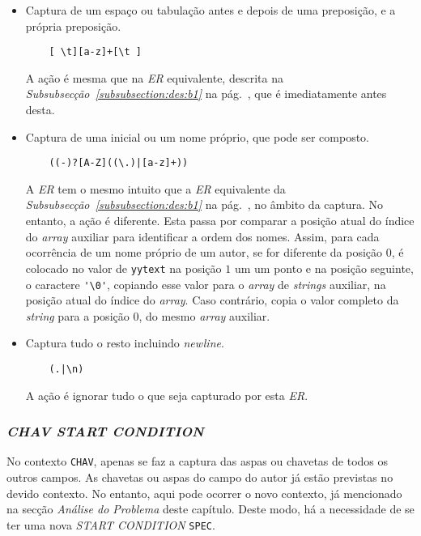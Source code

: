 \begin{itemize}
  
   \item Captura de um espaço ou tabulação antes e depois de uma
     preposição, e a própria preposição.
    \begin{verbatim}
    [ \t][a-z]+[\t ]
    \end{verbatim}
    A ação é mesma que na \emph{ER} equivalente, descrita na
    \emph{Subsubsecção~\ref{subsubsection:des:b1}} na
    pág.~\pageref{subsubsection:des:b1}, que é imediatamente antes desta.


   \item Captura de uma inicial ou um nome próprio, que  pode ser composto.
    \begin{verbatim}
    ((-)?[A-Z]((\.)|[a-z]+))
    \end{verbatim}
    A \emph{ER} tem o mesmo intuito que a \emph{ER} equivalente da
    \emph{Subsubsecção~\ref{subsubsection:des:b1}} na
    pág.~\pageref{subsubsection:des:b1}, no âmbito da captura. No entanto,
    a ação é diferente.  Esta passa por comparar a posição atual do índice do
    \emph{array} auxiliar para identificar a ordem dos nomes. Assim, para cada
    ocorrência de um nome próprio de um autor, se for diferente da posição $0$,
    é colocado no valor de \texttt{yytext} na posição $1$ um um ponto e na
    posição seguinte, o caractere \verb|'\0'|, copiando esse valor para
    o \emph{array} de \emph{strings} auxiliar, na posição atual do índice do
    \emph{array}. Caso contrário, copia o valor completo da \emph{string} para
    a posição $0$, do mesmo \emph{array} auxiliar.  

   \item Captura tudo o resto incluindo \emph{newline}.
    \begin{verbatim}
    (.|\n)
    \end{verbatim}
    A ação é ignorar tudo o que seja capturado por esta \emph{ER}.


\end{itemize}


\subsubsection{\emph{CHAV \emph{START CONDITION}}}

No contexto \texttt{CHAV}, apenas se faz a captura das aspas ou chavetas de todos
os outros campos. As chavetas ou aspas do campo do autor já estão previstas  no
devido contexto. No entanto, aqui pode ocorrer o novo contexto, já mencionado na
secção \emph{Análise do Problema} deste capítulo. Deste modo, há a necessidade
de se ter uma nova \emph{START CONDITION} \texttt{SPEC}. 


